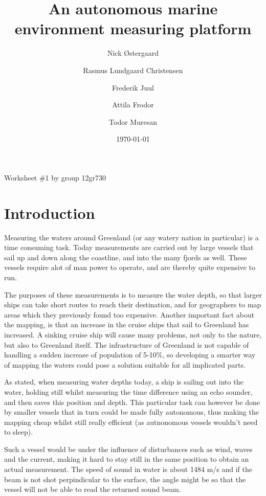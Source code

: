 \documentclass[a4paper,11pt,oneside,fleqn]{article}
\begin{document}
\author{Nick Østergaard \and Rasmus Lundgaard Christensen \and Frederik Juul \and Attila Frodor \and Todor Muresan}
\title{An autonomous marine environment measuring platform}
\date{\today}
\maketitle
\begin{center}
Worksheet \#1 by group 12gr730
\end{center}

\section{Introduction}
Measuring the waters around Greenland (or any watery nation in particular) is a time consuming task. Today measurements are carried out by large vessels that sail up and down along the coastline, and into the many fjords as well. These vessels require alot of man power to operate, and are thereby quite expensive to run.

The purposes of these measurements is to measure the water depth, so that larger ships can take short routes to reach their destination, and for geographers to map areas which they previously found too expensive. Another important fact about the mapping, is that an increase in the cruise ships that sail to Greenland has increased. A sinking cruise ship will cause many problems, not only to the nature, but also to Greenland itself. The infrastructure of Greenland is not capable of handling a sudden increase of population of 5-10\%, so developing a smarter way of mapping the waters could pose a solution suitable for all implicated parts. 

As stated, when measuring water depths today, a ship is sailing out into the water, holding still whilst measuring the time difference using an echo sounder, and then saves this position and depth. This particular task can however be done by smaller vessels that in turn could be made fully autonomous, thus making the mapping cheap whilst still really efficient (as autnonomous vessels wouldn't need to sleep). 

Such a vessel would be under the influence of disturbances such as wind, waves and the current, making it hard to stay still in the same position to obtain an actual measurement. The speed of sound in water is about 1484 m/s and if the beam is not shot perpindicular to the surface, the angle might be so that the vessel will not be able to read the returned sound beam. 
\end{document}
